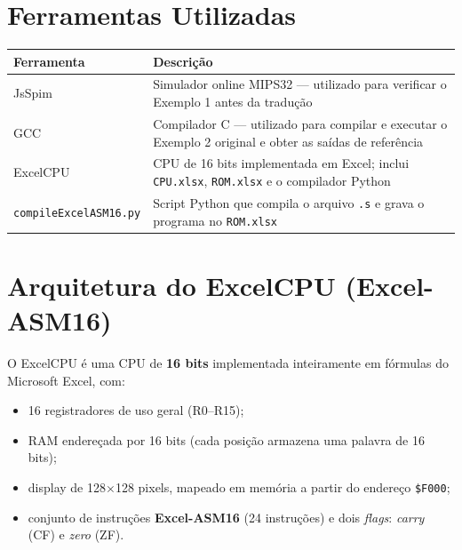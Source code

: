 \documentclass[12pt, a4paper]{article}
\begin{document}
\section{Ferramentas Utilizadas}

\begin{table}[h!]
\centering
\begin{tabularx}{\textwidth}{lX}
  \toprule
  \textbf{Ferramenta} & \textbf{Descrição} \\
  \midrule
  JsSpim & Simulador online MIPS32 --- utilizado para verificar o Exemplo 1 antes da tradução \\
  \addlinespace
  GCC & Compilador C --- utilizado para compilar e executar o Exemplo 2 original e obter as saídas de referência \\
  \addlinespace
  ExcelCPU & CPU de 16 bits implementada em Excel; inclui \texttt{CPU.xlsx}, \texttt{ROM.xlsx} e o compilador Python \\
  \addlinespace
  \texttt{compileExcelASM16.py} & Script Python que compila o arquivo \texttt{.s} e grava o programa no \texttt{ROM.xlsx} \\
  \bottomrule
\end{tabularx}
\end{table}

\section{Arquitetura do ExcelCPU (Excel-ASM16)}

O ExcelCPU é uma CPU de \textbf{16 bits} implementada inteiramente em fórmulas do Microsoft Excel, com:

\begin{itemize}[itemsep=2pt]
  \item 16 registradores de uso geral (R0--R15);
  \item RAM endereçada por 16 bits (cada posição armazena uma palavra de 16 bits);
  \item display de 128$\times$128 pixels, mapeado em memória a partir do endereço \texttt{\$F000};
  \item conjunto de instruções \textbf{Excel-ASM16} (24 instruções) e dois \emph{flags}: \emph{carry} (CF) e \emph{zero} (ZF).
\end{itemize}
\end{document}
